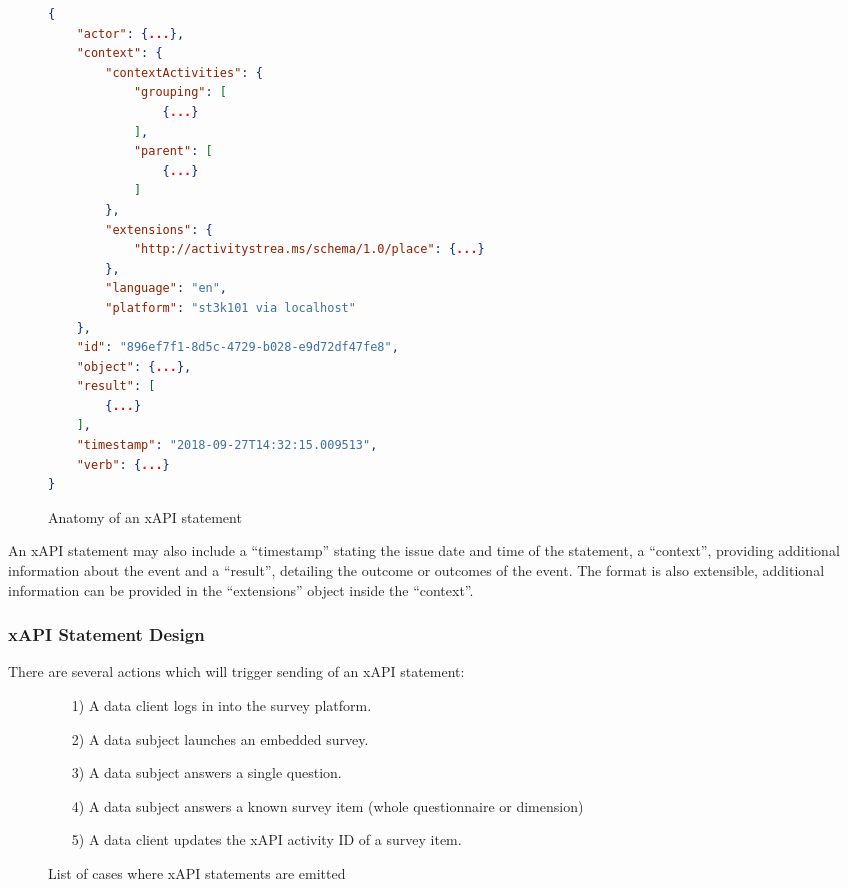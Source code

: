         \begin{figure}[H]
            \begin{lstlisting}[language=JSON]
{
    "actor": {...},
    "context": {
        "contextActivities": {
            "grouping": [
                {...}
            ],
            "parent": [
                {...}
            ]
        },
        "extensions": {
            "http://activitystrea.ms/schema/1.0/place": {...}
        },
        "language": "en",
        "platform": "st3k101 via localhost"
    },
    "id": "896ef7f1-8d5c-4729-b028-e9d72df47fe8",
    "object": {...},
    "result": [
        {...}
    ],
    "timestamp": "2018-09-27T14:32:15.009513",
    "verb": {...}
}

            \end{lstlisting}
            \caption{Anatomy of an xAPI statement}
            \label{fig:anatomy-xapi-statement}
        \end{figure}
    
    An xAPI statement may also include a ``timestamp'' stating the
    issue date and time of the statement, a ``context'', providing
    additional information about the event and a ``result'', detailing
    the outcome or outcomes of the event. The format is also extensible,
    additional information can be provided in the ``extensions''
    object inside the ``context''.

\subsubsection{xAPI Statement Design}
\label{section:concept:xapi-statement-design}
    There are several actions which will trigger sending of an
    xAPI statement:

    \begin{figure}[H]
        \begin{itemize}
            \item[1)] A data client logs in into the survey platform.
            \item[2)] A data subject launches an embedded survey.
            \item[3)] A data subject answers a single question.
            \item[4)] A data subject answers a known survey item (whole questionnaire or dimension)
            \item[5)] A data client updates the xAPI activity ID of a survey item.
        \end{itemize}
        \caption{List of cases where xAPI statements are emitted}
        \label{fig:xapi-statement-list}
    \end{figure}

